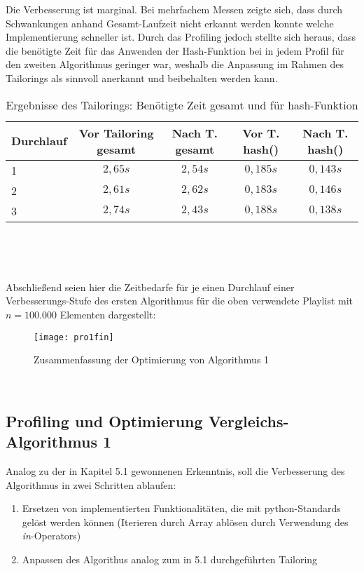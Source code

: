 \documentclass[
10pt, %
a4paper, %
oneside, %
headinclude,footinclude, %
BCOR5mm, %
]{scrartcl}
\begin{document}
Die Verbesserung ist marginal. Bei mehrfachem Messen zeigte sich, dass durch Schwankungen anhand Gesamt-Laufzeit nicht erkannt werden konnte welche Implementierung schneller ist. Durch das Profiling jedoch stellte sich heraus, dass die benötigte Zeit für das Anwenden der Hash-Funktion bei in jedem Profil für den zweiten Algorithmus geringer war, weshalb die Anpassung im Rahmen des Tailorings als sinnvoll anerkannt und beibehalten werden kann.


\begin{table}[h!]
	\centering 
	\begin{tabular}{|l|c|c|c|c|}
		\hline 
		Durchlauf & Vor Tailoring gesamt & Nach T. gesamt & Vor T. hash() & Nach T. hash()\\ 
		\hline
		1	& \(2,65s\)	& \(2,54s\)	& \(0,185s\) & \(0,143s\) \\
		\hline
		2	& \(2,61s\)	& \(2,62s\)	& \(0,183s\) & \(0,146s\) \\
		\hline
		3	& \(2,74s\)	& \(2,43s\)	& \(0,188s\) & \(0,138s\) \\
		\hline
	\end{tabular}\\
	\caption[Ergebnisse Tailoring]{Ergebnisse des Tailorings: Benötigte Zeit gesamt und für hash-Funktion}
\end{table}\

Abschließend seien hier die Zeitbedarfe für je einen Durchlauf einer Verbesserungs-Stufe des ersten Algorithmus für die oben verwendete Playlist mit \(n=100.000\) Elementen dargestellt:

\begin{figure}[h!]
	\centering 
	\texttt{[image: pro1fin]} 
	\caption[Zusammenfassung Optimierung Alg. 1]{Zusammenfassung der Optimierung von Algorithmus 1}
\end{figure}\

\subsection{Profiling und Optimierung Vergleichs-Algorithmus 1}
Analog zu der in Kapitel 5.1 gewonnenen Erkenntnis, soll die Verbesserung des Algorithmus in zwei Schritten ablaufen:
\begin{enumerate}[noitemsep]
	\item Ersetzen von implementierten Funktionalitäten, die mit python-Standards gelöst werden können (Iterieren durch Array ablösen durch Verwendung des \textit{in}-Operators)
	\item Anpassen des Algorithus analog zum in 5.1 durchgeführten Tailoring
\end{enumerate}\
\end{document}
